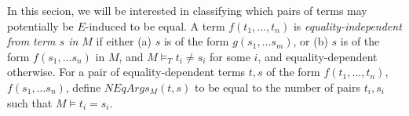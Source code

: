 \documentclass{llncs}
\begin{document}
\begin{comment}
Define the set $M \mid_{I(\psi)}$ as the set of all literals in $M$ containing instantiation constants from $\psi$.

\begin{lemma}
\label{lem:e-ind}
For each $E \in e\_ind(t,g,M,\psi)$, we have that $M \backslash t = g, E \models_T t = g$
\end{lemma}
\begin{proof}
The proof is by induction on the structure of $t$, with the induction hypothesis $M \backslash t = g, E \models_T t = g$.
If $t$ is an instantiation constant, then clearly $M \backslash t = g, t = rep( g ) \models_T t = g$.

Otherwise, the only other relevant case to consider is when $t$ is of the form $f( \bar{t_a} )$ and $g$ is of the form $f( \bar{ g_a } )$ (for all other cases, $e\_ind$ returns the empty set).
By congruence, it suffices to show for each $E$ in the constructed set $S$, we have that all the arguments of $t$ and $g$ are $E$-induced in $M$, or in other words $M \backslash t = g, E \models_T t_1 = g_1 \wedge \ldots \wedge t_n = g_n$.

Say we have constructed a set of equality sets $S_{i-1}$ such that $M \backslash t = g, E \models t_1 = g_1 \wedge \ldots \wedge t_{i-1} = g_{i-1}$ for each $E \in S_{i-1}$.
Our goal is to show that $e\_ind$ constructs an $S_i$ on the $i^{th}$ iteration such that for each $E \in S_i$, $M \backslash t = g, E \models_T t_1 = g_1 \wedge \ldots \wedge t_{i-1} = g_{i-1} \wedge t_i = g_i$.
In the case that $M \models_T t_i = g_i$, then $S_i$ is equal to $S_{i-1}$ and the statement holds immediately.
In the case that $M \not\models_T t_i = g_i$, then we may construct a set $S'$. 
Note that by our induction hypothesis, $M \backslash t_i = g_i, E \models_T t_i = g_i$ for each $E \in S'$.
We take $S_i$ to be the merge of $S_{i-1}$ and $S'$.
Since each $E \in S_i$ contains all equalities from some $E_1 \in S_{i-1}$ and some $E_2 \in S'$, we have that $M \backslash t = g, E \models_T t_1 = g_1 \wedge \ldots \wedge t_{i-1} = g_{i-1} \wedge t_i = g_i$ for each $E \in S_i$. $\Box$
\end{proof}
\end{comment}

In this secion, we will be interested in classifying which pairs of terms may potentially be $E$-induced to be equal.
A term $f( t_1, \ldots, t_n )$ is \emph{equality-independent from term $s$ in $M$} if either (a) $s$ is of the form $g( s_1, \ldots s_m )$, or (b) $s$ is of the form $f( s_1, \ldots s_n )$ in $M$, and $M \models_T t_i \neq s_i$ for some $i$, and equality-dependent otherwise.
For a pair of equality-dependent terms $t,s$ of the form $f( t_1, \ldots, t_n )$, $f( s_1, \ldots s_n )$, define $NEqArgs_M( t, s )$ to be equal to the number of pairs $t_i, s_i$ such that $M \models t_i = s_i$.
\end{document}
